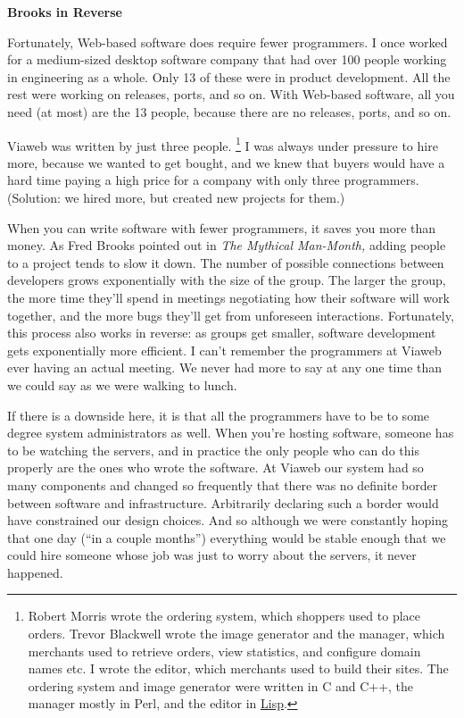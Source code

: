 \textbf{Brooks in Reverse}

Fortunately, Web-based software does require fewer programmers. I once
worked for a medium-sized desktop software company that had over 100
people working in engineering as a whole. Only 13 of these were in
product development. All the rest were working on releases, ports, and
so on. With Web-based software, all you need (at most) are the 13
people, because there are no releases, ports, and so on.

Viaweb was written by just three people. \footnote{Robert Morris wrote the ordering system, which shoppers used to
place orders. Trevor Blackwell wrote the image generator and the
manager, which merchants used to retrieve orders, view statistics, and
configure domain names etc. I wrote the editor, which merchants used to
build their sites. The ordering system and image generator were written
in C and C++, the manager mostly in Perl, and the editor in
\href{avg.html}{Lisp}.} I was always under
pressure to hire more, because we wanted to get bought, and we knew that
buyers would have a hard time paying a high price for a company with
only three programmers. (Solution: we hired more, but created new
projects for them.)

When you can write software with fewer programmers, it saves you more
than money. As Fred Brooks pointed out in \emph{The Mythical Man-Month,}
adding people to a project tends to slow it down. The number of possible
connections between developers grows exponentially with the size of the
group. The larger the group, the more time they'll spend in meetings
negotiating how their software will work together, and the more bugs
they'll get from unforeseen interactions. Fortunately, this process also
works in reverse: as groups get smaller, software development gets
exponentially more efficient. I can't remember the programmers at Viaweb
ever having an actual meeting. We never had more to say at any one time
than we could say as we were walking to lunch.

If there is a downside here, it is that all the programmers have to be
to some degree system administrators as well. When you're hosting
software, someone has to be watching the servers, and in practice the
only people who can do this properly are the ones who wrote the
software. At Viaweb our system had so many components and changed so
frequently that there was no definite border between software and
infrastructure. Arbitrarily declaring such a border would have
constrained our design choices. And so although we were constantly
hoping that one day (``in a couple months'') everything would be stable
enough that we could hire someone whose job was just to worry about the
servers, it never happened.

